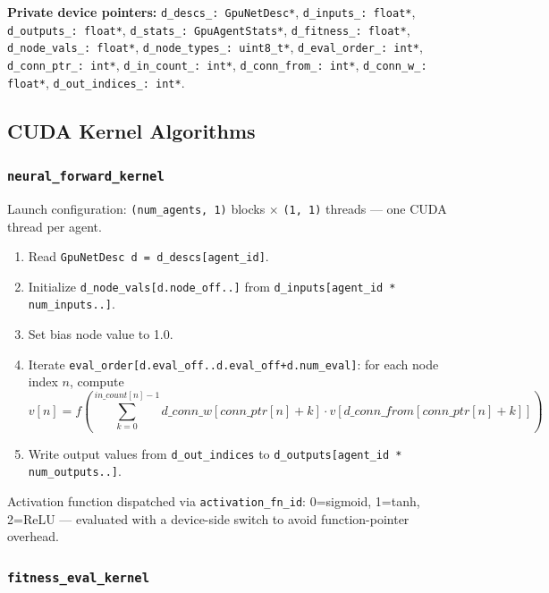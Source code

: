 \textbf{Private device pointers:}
\texttt{d\_descs\_: GpuNetDesc*}, \texttt{d\_inputs\_: float*},
\texttt{d\_outputs\_: float*}, \texttt{d\_stats\_: GpuAgentStats*},
\texttt{d\_fitness\_: float*}, \texttt{d\_node\_vals\_: float*},
\texttt{d\_node\_types\_: uint8\_t*}, \texttt{d\_eval\_order\_: int*},
\texttt{d\_conn\_ptr\_: int*}, \texttt{d\_in\_count\_: int*},
\texttt{d\_conn\_from\_: int*}, \texttt{d\_conn\_w\_: float*},
\texttt{d\_out\_indices\_: int*}.

\subsection{CUDA Kernel Algorithms}

\subsubsection{\texttt{neural\_forward\_kernel}}

Launch configuration: \texttt{(num\_agents, 1)} blocks × \texttt{(1, 1)} threads —
one CUDA thread per agent.

\begin{enumerate}[nosep]
  \item Read \texttt{GpuNetDesc d = d\_descs[agent\_id]}.
  \item Initialize \texttt{d\_node\_vals[d.node\_off..]} from \texttt{d\_inputs[agent\_id * num\_inputs..]}.
  \item Set bias node value to 1.0.
  \item Iterate \texttt{eval\_order[d.eval\_off..d.eval\_off+d.num\_eval]}:
    for each node index $n$, compute
    \[
      v[n] = f\!\left(\sum_{k=0}^{\mathit{in\_count}[n]-1}
             d\_conn\_w[\mathit{conn\_ptr}[n]+k] \cdot v[d\_conn\_from[\mathit{conn\_ptr}[n]+k]]\right)
    \]
  \item Write output values from \texttt{d\_out\_indices} to
    \texttt{d\_outputs[agent\_id * num\_outputs..]}.
\end{enumerate}

Activation function dispatched via \texttt{activation\_fn\_id}: 0=sigmoid, 1=tanh,
2=ReLU — evaluated with a device-side switch to avoid function-pointer overhead.

\subsubsection{\texttt{fitness\_eval\_kernel}}

